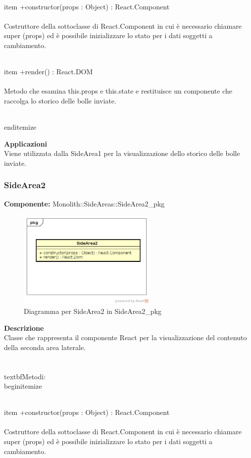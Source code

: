 \\item +constructor(props : Object) : React.Component 
\\\\
Costruttore della sottoclasse di React.Component in cui è necessario chiamare super (props) ed è possibile inizializzare lo stato per i dati soggetti a cambiamento.

\\item +render() : React.DOM 
\\\\
Metodo che esamina this.props e this.state e restituisce un componente che raccolga lo storico delle bolle inviate.

\\end{itemize} 


\textbf{Applicazioni}\\
Viene utilizzata dalla SideArea1 per la visualizzazione dello storico delle bolle inviate. 


\clearpage

\subsubsection{SideArea2}
\textbf{Componente:}  Monolith::SideAreas::SideArea2\_pkg\\
   \FloatBarrier
   \begin{figure}[ht]
   \centering
   \includegraphics[width=0.6\textwidth]{img/single-SideArea2}
   \caption{{Diagramma per SideArea2 in SideArea2\_pkg}}
\end{figure}
\FloatBarrier
\textbf{Descrizione}\\
Classe che rappresenta il componente React per la visualizzazione del contenuto della seconda area laterale. \\\\
\\textbf{Metodi:} 
\\begin{itemize}

\\item +constructor(props : Object) : React.Component 
\\\\
Costruttore della sottoclasse di React.Component in cui è necessario chiamare super (props) ed è possibile inizializzare lo stato per i dati soggetti a cambiamento.

